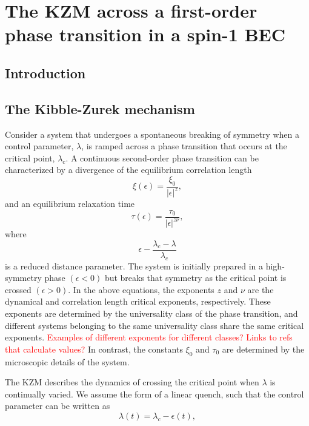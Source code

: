 \chapter{The KZM across a first-order phase transition in a spin-1 BEC}


\section{Introduction}

\section{The Kibble-Zurek mechanism}
Consider a system that undergoes a spontaneous breaking of symmetry when a
control parameter, $\lambda$, is ramped across a phase transition that occurs
at the critical point, $\lambda_c$.
A continuous second-order phase transition can be characterized by a divergence
of the equilibrium correlation length
\begin{equation}
    \xi(\epsilon) = \frac{\xi_0}{|\epsilon|^z},
\end{equation}
and an equilibrium relaxation time
\begin{equation}
    \tau(\epsilon) = \frac{\tau_0}{|\epsilon|^{z\nu}},
    \label{eq:equil-relax-time}
\end{equation}
where
\begin{equation}
    \epsilon - \frac{\lambda_c - \lambda}{\lambda_c}
\end{equation}
is a reduced distance parameter.
The system is initially prepared in a high-symmetry phase $(\epsilon < 0)$ but 
breaks that symmetry as the critical point is crossed $(\epsilon > 0)$.
In the above equations, the exponents $z$ and $\nu$ are the dynamical and
correlation length critical exponents, respectively.
These exponents are determined by the universality class of the phase
transition, and different systems belonging to the same universality class share
the same critical exponents.
\textcolor{red}{Examples of different exponents for different classes? Links
to refs that calculate values?}
In contrast, the constants $\xi_0$ and $\tau_0$ are determined by the
microscopic details of the system. \par
The KZM describes the dynamics of crossing the critical point when $\lambda$ 
is continually varied.
We assume the form of a linear quench, such that the control parameter can be
written as
\begin{equation}
    \lambda(t) = \lambda_c - \epsilon(t),
\end{equation}
